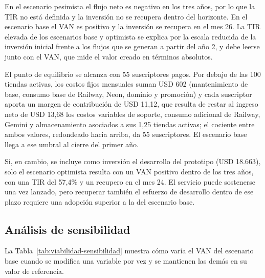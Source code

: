 En el escenario pesimista el flujo neto es negativo en los tres años, por lo que la TIR no está definida y la inversión no se recupera dentro del horizonte. En el escenario base el VAN es positivo y la inversión se recupera en el mes 26. La TIR elevada de los escenarios base y optimista se explica por la escala reducida de la inversión inicial frente a los flujos que se generan a partir del año 2, y debe leerse junto con el VAN, que mide el valor creado en términos absolutos.

El punto de equilibrio se alcanza con 55 suscriptores pagos. Por debajo de las 100 tiendas activas, los costos fijos mensuales suman USD 602 (mantenimiento de base, consumo base de Railway, Neon, dominio y promoción) y cada suscriptor aporta un margen de contribución de USD 11,12, que resulta de restar al ingreso neto de USD 13,68 los costos variables de soporte, consumo adicional de Railway, Gemini y almacenamiento asociados a sus 1,25 tiendas activas; el cociente entre ambos valores, redondeado hacia arriba, da 55 suscriptores. El escenario base llega a ese umbral al cierre del primer año.

Si, en cambio, se incluye como inversión el desarrollo del prototipo (USD 18.663), solo el escenario optimista resulta con un VAN positivo dentro de los tres años, con una TIR del 57,4\% y un recupero en el mes 24. El servicio puede sostenerse una vez lanzado, pero recuperar también el esfuerzo de desarrollo dentro de ese plazo requiere una adopción superior a la del escenario base.

\subsection{Análisis de sensibilidad}
\label{sec:viabilidad-sensibilidad}

La Tabla~\ref{tab:viabilidad-sensibilidad} muestra cómo varía el VAN del escenario base cuando se modifica una variable por vez y se mantienen las demás en su valor de referencia.

